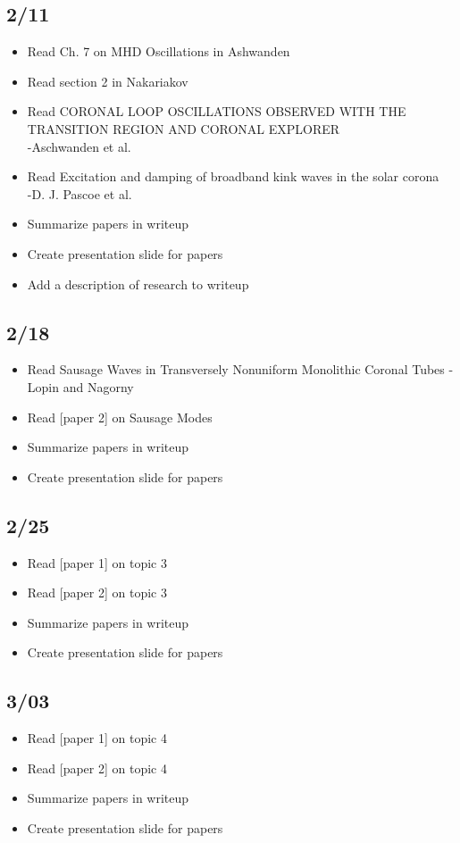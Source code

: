 \documentclass[12pt]{article}
\begin{document}
\subsection*{2/11}
\begin{itemize}
    \item Read Ch. 7 on MHD Oscillations in Ashwanden
    \item Read section 2 in Nakariakov
    \item Read CORONAL LOOP OSCILLATIONS OBSERVED WITH THE TRANSITION
        REGION AND CORONAL EXPLORER\\
        -Aschwanden et al.
    \item Read Excitation and damping of broadband kink waves in the solar
        corona\\
        -D. J. Pascoe et al.
    \item Summarize papers in writeup
    \item Create presentation slide for papers
    \item Add a description of research to writeup
\end{itemize}

\subsection*{2/18}
\begin{itemize}
    \item Read Sausage Waves in Transversely Nonuniform Monolithic Coronal
        Tubes -Lopin and Nagorny
    \item Read [paper 2] on Sausage Modes
    \item Summarize papers in writeup
    \item Create presentation slide for papers
\end{itemize}

\subsection*{2/25}
\begin{itemize}
    \item Read [paper 1] on topic 3
    \item Read [paper 2] on topic 3
    \item Summarize papers in writeup
    \item Create presentation slide for papers
\end{itemize}

\subsection*{3/03}
\begin{itemize}
    \item Read [paper 1] on topic 4
    \item Read [paper 2] on topic 4
    \item Summarize papers in writeup
    \item Create presentation slide for papers
\end{itemize}
\end{document}
